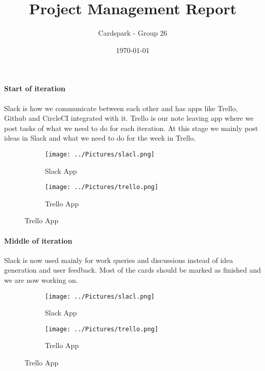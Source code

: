\documentclass[a4wide, 10pt]{article}
\begin{document}
\title{Project Management Report}

\author{Cardspark - Group 26}

\date{\today}         %

\maketitle            %

\paragraph{Start of iteration}
Slack is how we communicate between each other and has apps like Trello, Github and CircleCI integrated with it.  Trello is our note leaving app where we post tasks of what we need to do for each iteration.  At this stage we mainly post ideas in Slack and what we need to do for the week in Trello.
\begin{figure}[h]
\centering
\begin{subfigure}{.5\textwidth}
  \centering
	\texttt{[image: ../Pictures/slacl.png]}
  \caption{Slack App}
  \label{fig:sub1}
\end{subfigure}%
\begin{subfigure}{.5\textwidth}
  \centering
	\texttt{[image: ../Pictures/trello.png]}  
  \caption{Trello App}
  \label{fig:sub2}
\end{subfigure}
\label{fig:test}
\end{figure}
\vspace*{-\baselineskip} 

\paragraph{Middle of iteration} 
Slack is now used mainly for work queries and discussions instead of idea generation and user feedback.  Most of the cards should be marked as finished and we are now working on.
\begin{figure}[h]
\centering
\begin{subfigure}{.5\textwidth}
  \centering
	\texttt{[image: ../Pictures/slacl.png]}
  \caption{Slack App}
  \label{fig:sub1}
\end{subfigure}%
\begin{subfigure}{.5\textwidth}
  \centering
	\texttt{[image: ../Pictures/trello.png]}  
  \caption{Trello App}
  \label{fig:sub2}
\end{subfigure}
\label{fig:test}
\end{figure}
\vspace*{-\baselineskip} 
\end{document}
